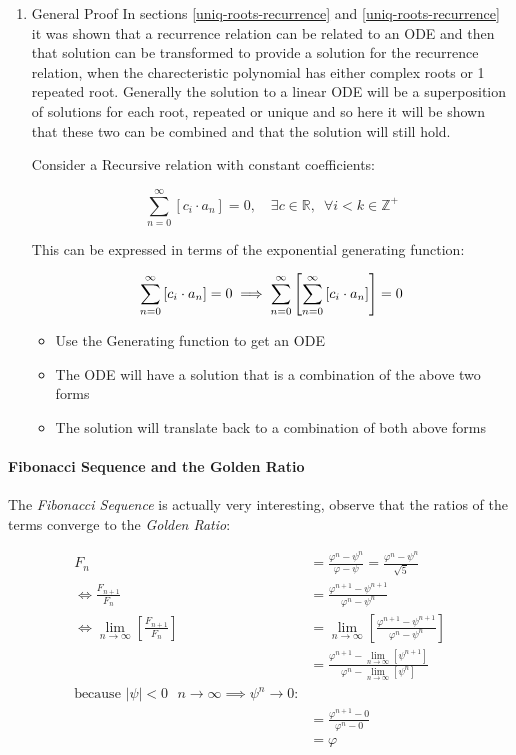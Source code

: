 \documentclass[11pt]{article}
\begin{document}
\begin{enumerate}
\item General Proof
\label{sec:org1c356ef}
In sections \ref{uniq-roots-recurrence} and \ref{uniq-roots-recurrence} it was shown that a recurrence relation can be related to an ODE and then that solution can be transformed to provide a solution for the recurrence relation, when the charecteristic polynomial has either complex roots or 1 repeated root. Generally the solution to a linear ODE will be a superposition of solutions for each root, repeated or unique and so here it will be shown that these two can be combined and that the solution will still hold.

Consider a Recursive relation with constant coefficients:

$$
\sum^{\infty}_{n= 0}   \left[ c_i \cdot  a_n \right] = 0, \quad \exists c \in
\mathbb{R}, \enspace \forall i<k\in\mathbb{Z}^+
$$

This can be expressed in terms of the exponential generating function:

$$
\sum^{\infty}_{n= 0}   \left[ c_i \cdot  a_n \right] = 0\\
\implies \sum^{\infty}_{n= 0}   \left[\sum^{\infty}_{n= 0}   \left[ c_i \cdot
a_n  \right]   \right] = 0
$$

\begin{itemize}
\item Use the Generating function to get an ODE
\item The ODE will have a solution that is a combination of the above two forms
\item The solution will translate back to a combination of both above forms
\end{itemize}
\end{enumerate}

\paragraph{Fibonacci Sequence and the Golden Ratio}
\label{fib-golden-ratio-proof}
The \emph{Fibonacci Sequence} is actually very interesting, observe that the ratios of the terms converge to the \emph{Golden Ratio}:

\begin{align*}
    F_n &= \frac{\varphi^n-\psi^n}{\varphi-\psi} = \frac{\varphi^n-\psi^n}{\sqrt 5} \\
    \iff \frac{F_{n+1}}{F_n}	&= \frac{\varphi^{n+ 1} - \psi^{n+  1}}{\varphi^{n} - \psi^{n}} \\
    \iff \lim_{n \rightarrow \infty}\left[ \frac{F_{n+1}}{F_n} \right]	&= \lim_{n \rightarrow \infty}\left[ \frac{\varphi^{n+ 1} - \psi^{n+  1}}{\varphi^{n} - \psi^{n}} \right] \\
&= \frac{\varphi^{n+ 1} -\lim_{n \rightarrow \infty}\left[ \psi^{n +  1} \right] }{\varphi^{n} - \lim_{n \rightarrow \infty}\left[ \psi^n \right] } \\
\text{because $\mid \psi \mid < 0$ $n \rightarrow \infty \implies \psi^{n} \rightarrow 0$:} \\
&= \frac{\varphi^{n+  1} -  0}{\varphi^{n} -  0} \\
&= \varphi
\end{align*}
\end{document}
